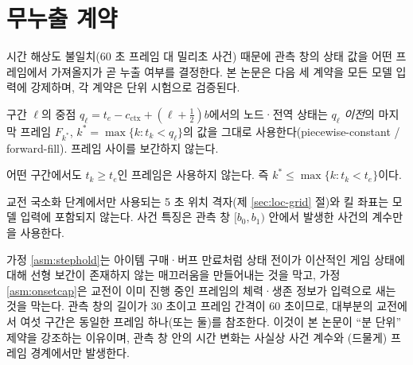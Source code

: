 
\section{무누출 계약}
\label{sec:problem-contract}

시간 해상도 불일치(60 초 프레임 대 밀리초 사건) 때문에 관측 창의 상태 값을 어떤 프레임에서 가져올지가 곧 누출 여부를 결정한다. 본 논문은 다음 세 계약을 모든 모델 입력에 강제하며, 각 계약은 단위 시험으로 검증된다.

\begin{assumption}[계단 유지 계약]
\label{asm:stephold}
구간 $\ell$의 중점 $q_\ell = t_e - c_{\mathrm{ctx}} + (\ell + \tfrac12) b$에서의 노드·전역 상태는 $q_\ell$ \emph{이전}의 마지막 프레임 $F_{k^*}$, $k^* = \max\{k : t_k < q_\ell\}$의 값을 그대로 사용한다(piecewise-constant / forward-fill). 프레임 사이를 보간하지 않는다.
\end{assumption}

\begin{assumption}[온셋 상한 계약]
\label{asm:onsetcap}
어떤 구간에서도 $t_k \ge t_e$인 프레임은 사용하지 않는다. 즉 $k^* \le \max\{k : t_k < t_e\}$이다.
\end{assumption}

\begin{assumption}[킬 좌표 배제 계약]
\label{asm:nokillpos}
교전 국소화 단계에서만 사용되는 5 초 위치 격자(제 \ref{sec:loc-grid} 절)와 킬 좌표는 모델 입력에 포함되지 않는다. 사건 특징은 관측 창 $[b_0, b_1)$ 안에서 발생한 사건의 계수만을 사용한다.
\end{assumption}

가정 \ref{asm:stephold}는 아이템 구매·버프 만료처럼 상태 전이가 이산적인 게임 상태에 대해 선형 보간이 존재하지 않는 매끄러움을 만들어내는 것을 막고, 가정 \ref{asm:onsetcap}은 교전이 이미 진행 중인 프레임의 체력·생존 정보가 입력으로 새는 것을 막는다. 관측 창의 길이가 30 초이고 프레임 간격이 60 초이므로, 대부분의 교전에서 여섯 구간은 동일한 프레임 하나(또는 둘)를 참조한다. 이것이 본 논문이 ``분 단위'' 제약을 강조하는 이유이며, 관측 창 안의 시간 변화는 사실상 사건 계수와 (드물게) 프레임 경계에서만 발생한다.
